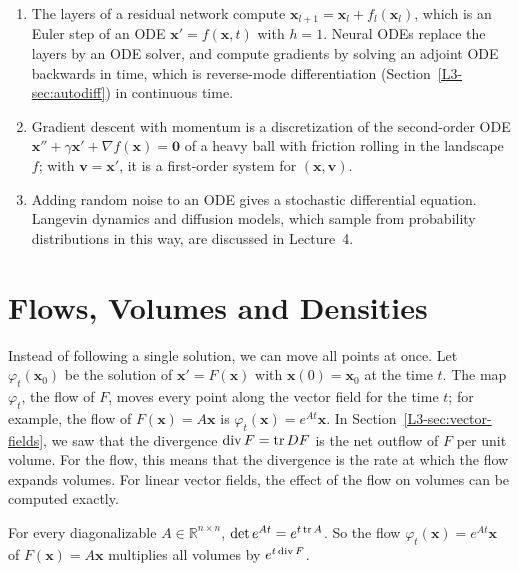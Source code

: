\begin{remark}
    \begin{enumerate}
        \item The layers of a residual network compute $\mathbf{x}_{l+1} = \mathbf{x}_l + f_l(\mathbf{x}_l)$, which is an Euler step of an ODE $\mathbf{x}' = f(\mathbf{x}, t)$ with $h = 1$. Neural ODEs replace the layers by an ODE solver, and compute gradients by solving an adjoint ODE backwards in time, which is reverse-mode differentiation (Section~\ref{L3-sec:autodiff}) in continuous time.
        \item Gradient descent with momentum is a discretization of the second-order ODE $\mathbf{x}'' + \gamma\mathbf{x}' + \nabla f(\mathbf{x}) = \mathbf{0}$ of a heavy ball with friction rolling in the landscape $f$; with $\mathbf{v} = \mathbf{x}'$, it is a first-order system for $(\mathbf{x}, \mathbf{v})$.
        \item Adding random noise to an ODE gives a stochastic differential equation. Langevin dynamics and diffusion models, which sample from probability distributions in this way, are discussed in Lecture~4.
    \end{enumerate}
\end{remark}

\section{Flows, Volumes and Densities}\label{L3-sec:flows}

Instead of following a single solution, we can move all points at once. Let $\varphi_t(\mathbf{x}_0)$ be the solution of $\mathbf{x}' = F(\mathbf{x})$ with $\mathbf{x}(0) = \mathbf{x}_0$ at the time $t$. The map $\varphi_t$, the flow of $F$, moves every point along the vector field for the time $t$; for example, the flow of $F(\mathbf{x}) = A\mathbf{x}$ is $\varphi_t(\mathbf{x}) = e^{At}\mathbf{x}$. In Section~\ref{L3-sec:vector-fields}, we saw that the divergence $\operatorname{div} F = \operatorname{tr} DF$ is the net outflow of $F$ per unit volume. For the flow, this means that the divergence is the rate at which the flow expands volumes. For linear vector fields, the effect of the flow on volumes can be computed exactly.

\begin{proposition}\label{L3-prop:liouville}
    For every diagonalizable $A \in \mathbb{R}^{n \times n}$, $\det e^{At} = e^{t\operatorname{tr} A}$. So the flow $\varphi_t(\mathbf{x}) = e^{At}\mathbf{x}$ of $F(\mathbf{x}) = A\mathbf{x}$ multiplies all volumes by $e^{t\operatorname{div} F}$.
\end{proposition}

